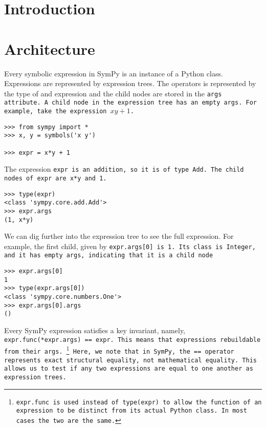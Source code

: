 \documentclass{article}
\begin{document}
\section{Introduction}


\section{Architecture}


Every symbolic expression in SymPy is an instance of a Python class.
Expressions are represented by expression trees. The operators is represented
by the type of and expression and the child nodes are stored in the \tt{args}
attribute. A child node in the expression tree has an empty \tt{args}. For
example, take the expression $xy + 1$.

\begin{verbatim}
>>> from sympy import *
>>> x, y = symbols('x y')

>>> expr = x*y + 1
\end{verbatim}

The expression \tt{expr} is an addition, so it is of type \tt{Add}. The child
nodes of \tt{expr} are \tt{x*y} and \tt{1}.

\begin{verbatim}
>>> type(expr)
<class 'sympy.core.add.Add'>
>>> expr.args
(1, x*y)
\end{verbatim}

We can dig further into the expression tree to see the full expression. For
example, the first child, given by \tt{expr.args[0]} is \tt{1}. Its class is
\tt{Integer}, and it has empty \tt{args}, indicating that it is a child node

\begin{verbatim}
>>> expr.args[0]
1
>>> type(expr.args[0])
<class 'sympy.core.numbers.One'>
>>> expr.args[0].args
()
\end{verbatim}

Every SymPy expression satisfies a key invariant, namely,
\tt{expr.func(*expr.args) == expr}. This means that expressions rebuildable
from their \tt{args}. \footnote{\tt{expr.func} is used instead of
  \tt{type(expr)} to allow the function of an expression to be distinct from
  its actual Python class. In most cases the two are the same.} Here, we note
that in SymPy, the \tt{==} operator represents exact structural equality, not
mathematical equality. This allows us to test if any two expressions are equal
to one another as expression trees.
\end{document}
